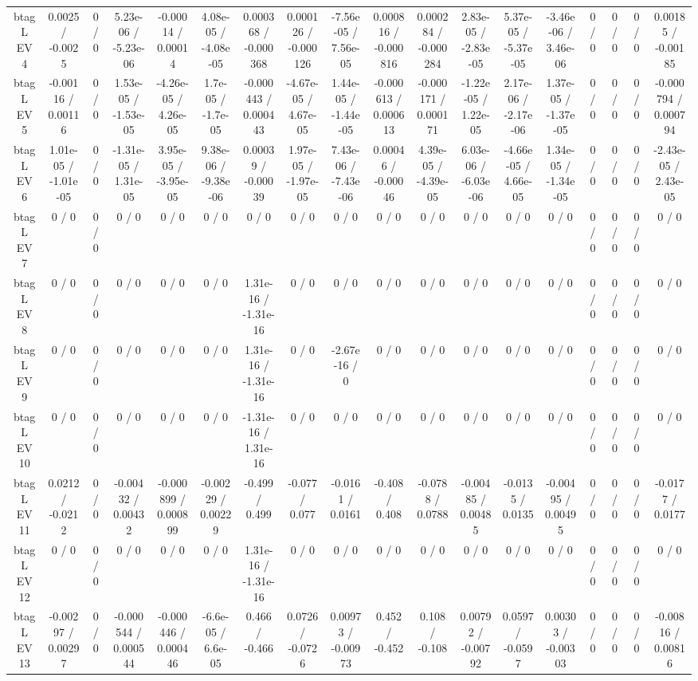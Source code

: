 \documentclass[10pt]{article}
\begin{document}
\begin{table}[htbp]
\begin{center}
\begin{tabular}{|c|c|c|c|c|c|c|c|c|c|c|c|c|c|c|c|c|c|}
  btag L EV 4 & 0.0025 / -0.0025 & 0 / 0 & 5.23e-06 / -5.23e-06 & -0.00014 / 0.00014 & 4.08e-05 / -4.08e-05 & 0.000368 / -0.000368 & 0.000126 / -0.000126 & -7.56e-05 / 7.56e-05 & 0.000816 / -0.000816 & 0.000284 / -0.000284 & 2.83e-05 / -2.83e-05 & 5.37e-05 / -5.37e-05 & -3.46e-06 / 3.46e-06 & 0 / 0 & 0 / 0 & 0 / 0 & 0.00185 / -0.00185 \\ 
  btag L EV 5 & -0.00116 / 0.00116 & 0 / 0 & 1.53e-05 / -1.53e-05 & -4.26e-05 / 4.26e-05 & 1.7e-05 / -1.7e-05 & -0.000443 / 0.000443 & -4.67e-05 / 4.67e-05 & 1.44e-05 / -1.44e-05 & -0.000613 / 0.000613 & -0.000171 / 0.000171 & -1.22e-05 / 1.22e-05 & 2.17e-06 / -2.17e-06 & 1.37e-05 / -1.37e-05 & 0 / 0 & 0 / 0 & 0 / 0 & -0.000794 / 0.000794 \\ 
  btag L EV 6 & 1.01e-05 / -1.01e-05 & 0 / 0 & -1.31e-05 / 1.31e-05 & 3.95e-05 / -3.95e-05 & 9.38e-06 / -9.38e-06 & 0.00039 / -0.00039 & 1.97e-05 / -1.97e-05 & 7.43e-06 / -7.43e-06 & 0.00046 / -0.00046 & 4.39e-05 / -4.39e-05 & 6.03e-06 / -6.03e-06 & -4.66e-05 / 4.66e-05 & 1.34e-05 / -1.34e-05 & 0 / 0 & 0 / 0 & 0 / 0 & -2.43e-05 / 2.43e-05 \\ 
  btag L EV 7 & 0 / 0 & 0 / 0 & 0 / 0 & 0 / 0 & 0 / 0 & 0 / 0 & 0 / 0 & 0 / 0 & 0 / 0 & 0 / 0 & 0 / 0 & 0 / 0 & 0 / 0 & 0 / 0 & 0 / 0 & 0 / 0 & 0 / 0 \\ 
  btag L EV 8 & 0 / 0 & 0 / 0 & 0 / 0 & 0 / 0 & 0 / 0 & 1.31e-16 / -1.31e-16 & 0 / 0 & 0 / 0 & 0 / 0 & 0 / 0 & 0 / 0 & 0 / 0 & 0 / 0 & 0 / 0 & 0 / 0 & 0 / 0 & 0 / 0 \\ 
  btag L EV 9 & 0 / 0 & 0 / 0 & 0 / 0 & 0 / 0 & 0 / 0 & 1.31e-16 / -1.31e-16 & 0 / 0 & -2.67e-16 / 0 & 0 / 0 & 0 / 0 & 0 / 0 & 0 / 0 & 0 / 0 & 0 / 0 & 0 / 0 & 0 / 0 & 0 / 0 \\ 
  btag L EV 10 & 0 / 0 & 0 / 0 & 0 / 0 & 0 / 0 & 0 / 0 & -1.31e-16 / 1.31e-16 & 0 / 0 & 0 / 0 & 0 / 0 & 0 / 0 & 0 / 0 & 0 / 0 & 0 / 0 & 0 / 0 & 0 / 0 & 0 / 0 & 0 / 0 \\ 
  btag L EV 11 & 0.0212 / -0.0212 & 0 / 0 & -0.00432 / 0.00432 & -0.000899 / 0.000899 & -0.00229 / 0.00229 & -0.499 / 0.499 & -0.077 / 0.077 & -0.0161 / 0.0161 & -0.408 / 0.408 & -0.0788 / 0.0788 & -0.00485 / 0.00485 & -0.0135 / 0.0135 & -0.00495 / 0.00495 & 0 / 0 & 0 / 0 & 0 / 0 & -0.0177 / 0.0177 \\ 
  btag L EV 12 & 0 / 0 & 0 / 0 & 0 / 0 & 0 / 0 & 0 / 0 & 1.31e-16 / -1.31e-16 & 0 / 0 & 0 / 0 & 0 / 0 & 0 / 0 & 0 / 0 & 0 / 0 & 0 / 0 & 0 / 0 & 0 / 0 & 0 / 0 & 0 / 0 \\ 
  btag L EV 13 & -0.00297 / 0.00297 & 0 / 0 & -0.000544 / 0.000544 & -0.000446 / 0.000446 & -6.6e-05 / 6.6e-05 & 0.466 / -0.466 & 0.0726 / -0.0726 & 0.00973 / -0.00973 & 0.452 / -0.452 & 0.108 / -0.108 & 0.00792 / -0.00792 & 0.0597 / -0.0597 & 0.00303 / -0.00303 & 0 / 0 & 0 / 0 & 0 / 0 & -0.00816 / 0.00816 \\ 

\end{tabular}
\end{center}
\end{table}
\end{document}
